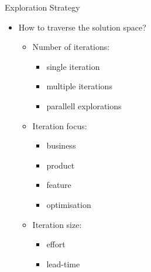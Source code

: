 \begin{Slide}{Exploration Strategy}
\begin{itemize}
\item How to traverse the solution space?
\begin{itemize}
\item Number of iterations:
\begin{itemize}
\item single iteration
\item multiple iterations
\item parallell explorations
\end{itemize}
\item Iteration focus: 
\begin{itemize}
\item business
\item product
\item feature
\item optimisation
\end{itemize}
\item Iteration size: 
\begin{itemize}
\item effort
\item lead-time

\end{itemize}
\end{itemize}
\end{itemize}
\end{Slide}
